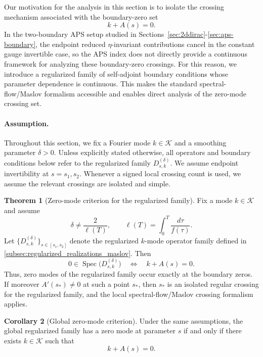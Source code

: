 \documentclass[11pt]{article}
\theoremstyle{definition}
\newtheorem{theorem}{Theorem}[section]
\newtheorem{corollary}[theorem]{Corollary}
\DeclareMathOperator{\Spec}{Spec}
\numberwithin{equation}{section}
\begin{document}
Our motivation for the analysis in this section is to isolate the crossing mechanism associated with the boundary-zero set
\begin{equation}
k+A(s)=0.
\end{equation}
In the two-boundary APS setup studied in Sections~\ref{sec:2ddirac}-\ref{sec:aps-boundary}, the endpoint reduced $\eta$-invariant contributions cancel in the constant gauge invertible case, so the APS index does not directly provide a continuous framework for analyzing these boundary-zero crossings. For this reason, we introduce a regularized family of self-adjoint boundary conditions whose parameter dependence is continuous. This makes the standard spectral-flow/Maslov formalism accessible and enables direct analysis of the zero-mode crossing set.

\paragraph{Assumption.}
Throughout this section, we fix a Fourier mode \(k\in\mathcal K\) and a smoothing parameter \(\delta>0\). Unless explicitly stated otherwise, all operators and boundary conditions below refer to the regularized family \(D^{(\delta)}_{s,k}\). We assume endpoint invertibility at \(s=s_1,s_2\). Whenever a signed local crossing count is used, we assume the relevant crossings are isolated and simple.

\begin{theorem}[Zero-mode criterion for the regularized family]
\label{thm:section5-main}
Fix a mode \(k\in\mathcal K\) and assume
\begin{equation}
\delta \neq \frac{2}{\ell(T)},
\qquad
\ell(T)=\int_0^T \frac{d\tau}{f(\tau)}.
\end{equation}
Let \(\{D^{(\delta)}_{s,k}\}_{s\in[s_1,s_2]}\) denote the regularized \(k\)-mode operator family defined in \autoref{subsec:regularized_realizations_maslov}. Then
\begin{equation}
0\in\Spec\bigl(D^{(\delta)}_{s,k}\bigr)
\quad\Longleftrightarrow\quad
k+A(s)=0.
\end{equation}
Thus, zero modes of the regularized family occur exactly at the boundary zeros. If moreover
\(A'(s_*)\neq 0\) at such a point \(s_*\), then \(s_*\) is an isolated regular crossing for the regularized family, and the local spectral-flow/Maslov crossing formalism applies.
\end{theorem}

\begin{corollary}[Global zero-mode criterion]
\label{cor:global-zero-mode-criterion}
Under the same assumptions, the global regularized family has a zero mode at parameter \(s\) if and only if there exists \(k\in\mathcal K\) such that
\begin{equation}
k+A(s)=0.
\end{equation}
\end{corollary}
\end{document}

